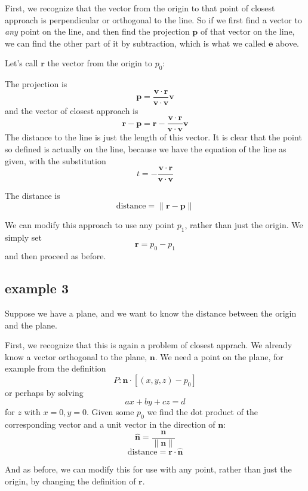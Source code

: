 \documentclass[11pt, oneside]{article}   	%
\begin{document}
First, we recognize that the vector from the origin to that point of closest approach is perpendicular or orthogonal to the line.  So if we first find a vector to \emph{any} point on the line, and then find the projection $\mathbf{p}$ of that vector on the line, we can find the other part of it by subtraction, which is what we called $\mathbf{e}$ above.

Let's call $\mathbf{r}$ the vector from the origin to $p_0$:

The projection is 
\[ \mathbf{p} = \frac{\mathbf{v} \cdot \mathbf{r}}{\mathbf{v} \cdot \mathbf{v}} \mathbf{v}  \]
and the vector of closest approach is
\[ \mathbf{r} - \mathbf{p} = \mathbf{r} - \frac{\mathbf{v} \cdot \mathbf{r}}{\mathbf{v} \cdot \mathbf{v}} \mathbf{v}  \]
The distance to the line is just the length of this vector.  It is clear that the point so defined is actually on the line, because we have the equation of the line as given, with the substitution
\[ t = -\frac{\mathbf{v} \cdot \mathbf{r}}{\mathbf{v} \cdot \mathbf{v}} \]

The distance is
\[  \text{distance} = \| \mathbf{r} - \mathbf{p} \| \]

We can modify this approach to use any point $p_1$, rather than just the origin.  We simply set
\[ \mathbf{r} = p_0 - p_1 \]
and then proceed as before.

\subsection*{example 3}
Suppose we have a plane, and we want to know the distance between the origin and the plane.

First, we recognize that this is again a problem of closest apprach.  We already know a vector orthogonal to the plane, $\mathbf{n}$.  We need a point on the plane, for example from the definition
\[ P :  \mathbf{n} \cdot [(x,y,z) - p_0] \]
or perhaps by solving 
\[ ax + by + cz = d \]
for $z$ with $x=0, y=0$.  Given some $p_0$ we find the dot product of the corresponding vector and a unit vector in the direction of $\mathbf{n}$:
\[ \hat{\mathbf{n}} = \frac{\mathbf{n}}{\| \mathbf{n} \| } \]
\[ \text{distance} = \mathbf{r} \cdot  \hat{\mathbf{n}} \]

And as before, we can modify this for use with any point, rather than just the origin, by changing the definition of $\mathbf{r}$.
\end{document}
